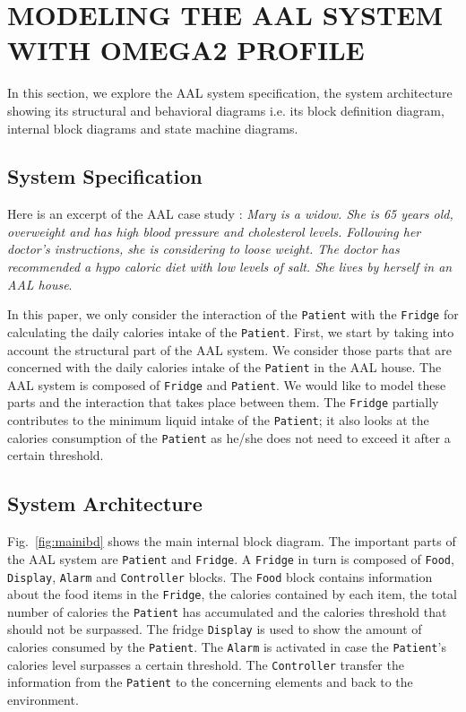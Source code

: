 \documentclass[a4paper,twoside]{article}
\begin{document}

\section{\uppercase{Modeling the AAL system with OMEGA2 Profile}}
\label{sec:aal_model}
\noindent In this section, we explore the AAL system specification, the system architecture showing its structural and behavioral diagrams i.e. its block definition diagram, internal block diagrams and state machine diagrams.

\subsection{System Specification}
Here is an excerpt of the AAL case study \cite{JWhittle2009}: \textit{Mary is a widow. She is 65 years old, overweight and has high blood pressure and cholesterol levels. Following her doctor’s instructions, she is considering to loose weight. The doctor has recommended a hypo caloric diet with low levels of salt. She lives by herself in an AAL house}. 

In this paper, we only consider the interaction of the \texttt{Patient} with the \texttt{Fridge} for calculating the daily calories intake of the \texttt{Patient}. First, we start by taking into account the structural part of the AAL system. We consider those parts that are concerned with the daily calories intake of the \texttt{Patient} in the AAL house. The AAL system is composed of \texttt{Fridge} and \texttt{Patient}. We would like to model these parts and the interaction that takes place between them. The \texttt{Fridge} partially contributes to the minimum liquid intake of the \texttt{Patient}; it also looks at the calories consumption of the \texttt{Patient} as he/she does not need to exceed it after a certain threshold. 

\subsection{System Architecture}
Fig.~\ref{fig:mainibd} shows the main internal block diagram. The important parts of the AAL system are \texttt{Patient} and \texttt{Fridge}. A \texttt{Fridge} in turn is composed of \texttt{Food}, \texttt{Display}, \texttt{Alarm} and \texttt{Controller} blocks. The \texttt{Food} block contains information about the food items in the \texttt{Fridge}, the calories contained by each item, the total number of calories the \texttt{Patient} has accumulated and the calories threshold that should not be surpassed. The fridge \texttt{Display} is used to show the amount of calories consumed by the \texttt{Patient}. The \texttt{Alarm} is activated in case the \texttt{Patient}'s calories level surpasses a certain threshold. The \texttt{Controller} transfer the information from the \texttt{Patient} to the concerning elements and back to the environment. 
\end{document}
